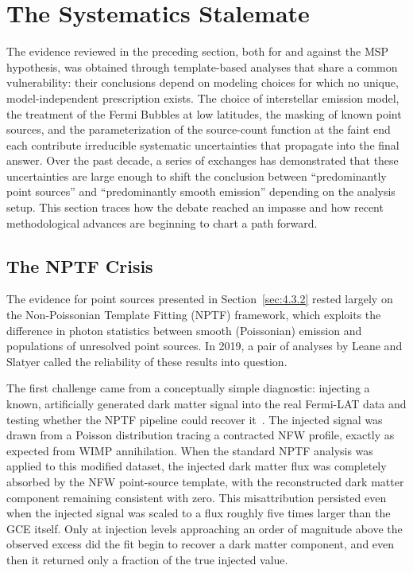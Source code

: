 
\section{The Systematics Stalemate}
\label{sec:4.4}

The evidence reviewed in the preceding section, both for and against the MSP hypothesis, was obtained through template-based analyses that share a common vulnerability: their conclusions depend on modeling choices for which no unique, model-independent prescription exists.
The choice of interstellar emission model, the treatment of the Fermi Bubbles at low latitudes, the masking of known point sources, and the parameterization of the source-count function at the faint end each contribute irreducible systematic uncertainties that propagate into the final answer.
Over the past decade, a series of exchanges has demonstrated that these uncertainties are large enough to shift the conclusion between ``predominantly point sources'' and ``predominantly smooth emission'' depending on the analysis setup.
This section traces how the debate reached an impasse and how recent methodological advances are beginning to chart a path forward.

\subsection{The NPTF Crisis}
\label{sec:4.4.1}

The evidence for point sources presented in Section~\ref{sec:4.3.2} rested largely on the Non-Poissonian Template Fitting (NPTF) framework, which exploits the difference in photon statistics between smooth (Poissonian) emission and populations of unresolved point sources.
In 2019, a pair of analyses by Leane and Slatyer called the reliability of these results into question.

The first challenge came from a conceptually simple diagnostic: injecting a known, artificially generated dark matter signal into the real Fermi-LAT data and testing whether the NPTF pipeline could recover it~\cite{Leane:2019xiy}.
The injected signal was drawn from a Poisson distribution tracing a contracted NFW profile, exactly as expected from WIMP annihilation.
When the standard NPTF analysis was applied to this modified dataset, the injected dark matter flux was completely absorbed by the NFW point-source template, with the reconstructed dark matter component remaining consistent with zero.
This misattribution persisted even when the injected signal was scaled to a flux roughly five times larger than the GCE itself.
Only at injection levels approaching an order of magnitude above the observed excess did the fit begin to recover a dark matter component, and even then it returned only a fraction of the true injected value.

